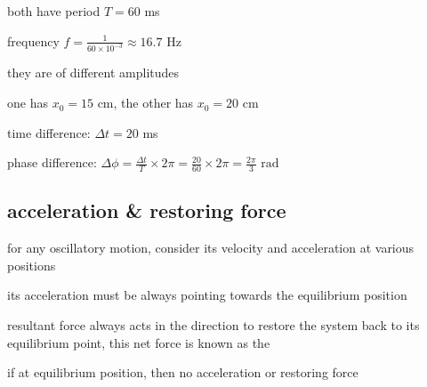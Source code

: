 
\begin{marginfigure}
	\vspace*{-12pt}
		\centering
{}
\vspace*{-25pt}
\end{marginfigure}

\begin{soln} both have period $T=60$ ms

frequency $f=\frac{1}{60\times10^{-3}} \approx 16.7$ Hz

they are of different amplitudes

one has $x_0=15$ cm, the other has $x_0=20$ cm

time difference: $\Delta t = 20$ ms

phase difference: $\Delta \phi = \frac{\Delta t}{T} \times 2\pi = \frac{20}{60} \times 2\pi = \frac{2\pi}{3} \text{ rad}$
\end{soln}


\subsection{acceleration \& restoring force}
for any oscillatory motion, consider its velocity and acceleration at various positions

its acceleration must be always pointing towards the equilibrium position

resultant force always acts in the direction to restore the system back to its equilibrium point, this net force is known as the 

if at equilibrium position, then no acceleration or restoring force





